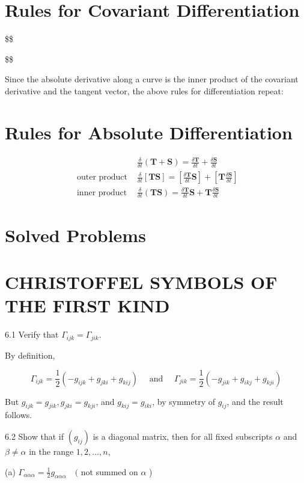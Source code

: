 \documentclass[10pt]{article}
\begin{document}
\section*{Rules for Covariant Differentiation}
\$\$

\$\$

Since the absolute derivative along a curve is the inner product of the covariant derivative and the tangent vector, the above rules for differentiation repeat:

\section*{Rules for Absolute Differentiation}
$$
\begin{array}{ll} 
& \frac{\delta}{\delta t}(\mathbf{T}+\mathbf{S})=\frac{\delta \mathbf{T}}{\delta t}+\frac{\delta \mathbf{S}}{\delta t} \\
\text { outer product } & \frac{\delta}{\delta t}[\mathbf{T S}]=\left[\frac{\delta \mathbf{T}}{\delta t} \mathbf{S}\right]+\left[\mathbf{T} \frac{\delta \mathbf{S}}{\delta t}\right] \\
\text { inner product } & \frac{\delta}{\delta t}(\mathbf{T S})=\frac{\delta \mathbf{T}}{\delta t} \mathbf{S}+\mathbf{T} \frac{\delta \mathbf{S}}{\delta t}
\end{array}
$$

\section*{Solved Problems}
\section*{CHRISTOFFEL SYMBOLS OF THE FIRST KIND}
6.1 Verify that $\Gamma_{i j k}=\Gamma_{j i k}$.

By definition,

$$
\Gamma_{i j k}=\frac{1}{2}\left(-g_{i j k}+g_{j k i}+g_{k i j}\right) \quad \text { and } \quad \Gamma_{j i k}=\frac{1}{2}\left(-g_{j i k}+g_{i k j}+g_{k j i}\right)
$$

But $g_{i j k}=g_{j i k}, g_{j k i}=g_{k j i}$, and $g_{k i j}=g_{i k i}$, by symmetry of $g_{i j}$, and the result follows.

6.2 Show that if $\left(g_{i j}\right)$ is a diagonal matrix, then for all fixed subscripts $\alpha$ and $\beta \neq \alpha$ in the range $1,2, \ldots, n$,

(a) $\Gamma_{\alpha \alpha \alpha}=\frac{1}{2} g_{\alpha \alpha \alpha} \quad($ not summed on $\alpha$ )
\end{document}
